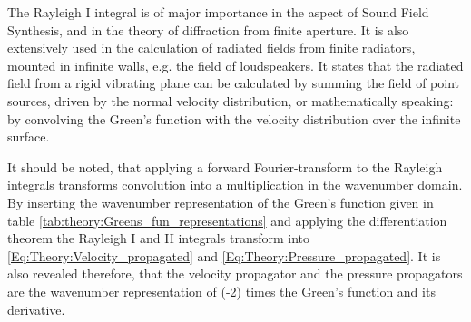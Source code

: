 The Rayleigh I integral is of major importance in the aspect of Sound Field Synthesis, and in the theory of diffraction from finite aperture. It is also extensively used in the calculation of radiated fields from finite radiators, mounted in infinite walls, e.g. the field of loudspeakers. It states that the radiated field from a rigid vibrating plane can be calculated by summing the field of point sources, driven by the normal velocity distribution, or mathematically speaking: by convolving the Green's function with the velocity distribution over the infinite surface.

It should be noted, that applying a forward Fourier-transform to the Rayleigh integrals transforms convolution into a multiplication in the wavenumber domain. By inserting the wavenumber representation of the Green's function given in table \ref{tab:theory:Greens_fun_representations}  and applying the differentiation theorem the Rayleigh I and II integrals transform into \eqref{Eq:Theory:Velocity_propagated} and \eqref{Eq:Theory:Pressure_propagated}. It is also revealed therefore, that the velocity propagator and the pressure propagators are the wavenumber representation of (-2) times the Green's function and its derivative.
